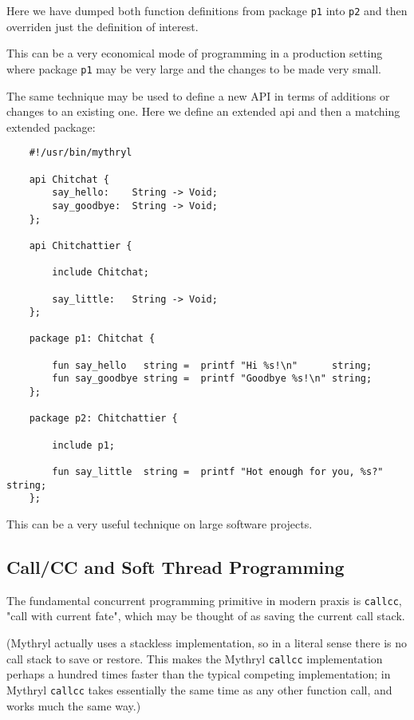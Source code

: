 Here we have dumped both function definitions from package {\tt p1} 
into {\tt p2} and then overriden just the definition of interest.

This can be a very economical mode of programming in a production setting 
where package {\tt p1} may be very large and the changes to be made very 
small.

The same technique may be used to define a new API in terms of additions 
or changes to an existing one.  Here we define an extended api and then 
a matching extended package:

\begin{verbatim}
    #!/usr/bin/mythryl

    api Chitchat {
        say_hello:    String -> Void;
        say_goodbye:  String -> Void;
    };

    api Chitchattier {

        include Chitchat;

        say_little:   String -> Void;
    };

    package p1: Chitchat {

        fun say_hello   string =  printf "Hi %s!\n"      string;
        fun say_goodbye string =  printf "Goodbye %s!\n" string;
    };

    package p2: Chitchattier {

        include p1;

        fun say_little  string =  printf "Hot enough for you, %s?"  string;
    };
\end{verbatim}

This can be a very useful technique on large software projects.

\cutend*

\subsection{Call/CC and Soft Thread Programming}
\label{section:tut:full-monte:callcc}

The fundamental concurrent programming primitive in modern praxis 
is {\tt callcc}, "call with current fate", which may be 
thought of as saving the current call stack.

(Mythryl actually uses a stackless implementation, so in a literal 
sense there is no call stack to save or restore.  This makes the 
Mythryl {\tt callcc} implementation perhaps a hundred times faster 
than the typical competing implementation; in Mythryl {\tt callcc} 
takes essentially the same time as any other function call, and 
works much the same way.)

